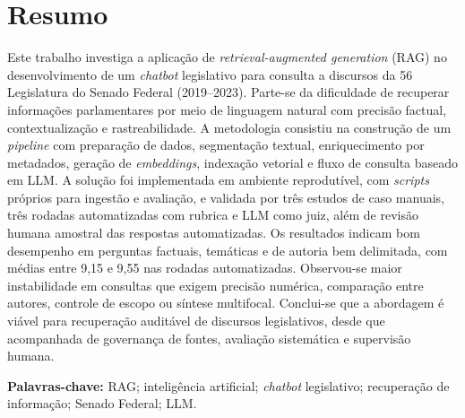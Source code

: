 \section*{Resumo}

Este trabalho investiga a aplicação de \textit{retrieval-augmented generation} (RAG) no desenvolvimento de um \textit{chatbot} legislativo para consulta a discursos da 56\textordfeminine{} Legislatura do Senado Federal (2019--2023). Parte-se da dificuldade de recuperar informações parlamentares por meio de linguagem natural com precisão factual, contextualização e rastreabilidade. A metodologia consistiu na construção de um \textit{pipeline} com preparação de dados, segmentação textual, enriquecimento por metadados, geração de \textit{embeddings}, indexação vetorial e fluxo de consulta baseado em LLM. A solução foi implementada em ambiente reprodutível, com \textit{scripts} próprios para ingestão e avaliação, e validada por três estudos de caso manuais, três rodadas automatizadas com rubrica e LLM como juiz, além de revisão humana amostral das respostas automatizadas. Os resultados indicam bom desempenho em perguntas factuais, temáticas e de autoria bem delimitada, com médias entre 9,15 e 9,55 nas rodadas automatizadas. Observou-se maior instabilidade em consultas que exigem precisão numérica, comparação entre autores, controle de escopo ou síntese multifocal. Conclui-se que a abordagem é viável para recuperação auditável de discursos legislativos, desde que acompanhada de governança de fontes, avaliação sistemática e supervisão humana.

\textbf{Palavras-chave:} RAG; inteligência artificial; \textit{chatbot} legislativo; recuperação de informação; Senado Federal; LLM.
